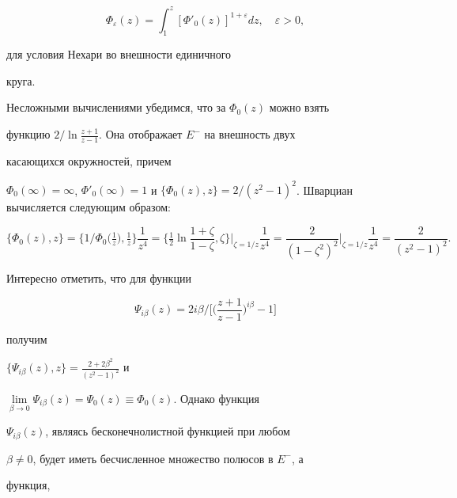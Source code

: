 $$ 


\Phi_\varepsilon(z)=\int^z_1[\Phi'_0(z)]^{1+\varepsilon}dz,\quad 


\varepsilon>0, 


$$ 


для условия Нехари во внешности единичного 


круга. 


 


Несложными вычислениями убедимся, что за $\Phi_{0}(z)$ можно взять 


функцию $2/\ln \frac{z+1}{z-1}$. Она отображает $E^-$ на внешность двух 


касающихся окружностей, причем 


$\Phi_{0}(\infty)=\infty$, $\Phi'_0(\infty)=1$ и $\{\Phi_{0}(z),z\}= 


2/(z^2 -1)^2$. Шварциан вычисляется следующим образом:


$$ 


\{\Phi_{0}(z),z\} = \big\{1/\Phi_{0} 


\big(\tfrac{1}{z}\big),\tfrac{1}{z}\big\}\frac{1}{z^4}= 


\bigg\{\tfrac{1}{2}\ln 


\frac{1+\zeta}{1-\zeta},\zeta\bigg\}\Big|_{\zeta=1/z}\frac{1}{z^4}= 


\frac{2}{(1-\zeta^2)^2}\Big|_{\zeta=1/z} 


\frac{1}{z^4}=\frac{2}{(z^2-1)^2}. 


$$ 


 


Интересно отметить, что для функции 


$$ 


\Psi_{i\beta}(z)=2i\beta\Big/\bigg[\bigg(\frac{z+1}{z-1} 


\bigg)^{i\beta}-1\bigg] 


$$ 


получим 


$\{\Psi_{i\beta}(z),z\}=\frac{2+2\beta^2}{(z^2 -1)^2}$ и 


$\lim\limits_{\beta\to 0} 


\Psi_{i\beta}(z)=\Psi_{0}(z)\equiv\Phi_{0}(z)$. Однако функция 


$\Psi_{i\beta}(z)$, являясь бесконечнолистной функцией при любом 


$\beta\ne0$, будет иметь бесчисленное множество полюсов в $E^{-}$, а 


функция, 


